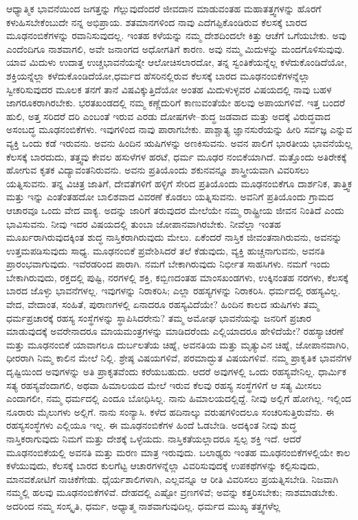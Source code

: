 \vskip   4pt

ಆಧ್ಯಾತ್ಮಿಕ ಭಾವನೆಯಿಂದ ಜಗತ್ತನ್ನು ಗೆಲ್ಲುವುದೆಂದರೆ ಜೀವದಾನ ಮಾಡುವಂತಹ ಮಹಾತತ್ತ್ವಗಳನ್ನು ಹೊರಗೆ ಕಳುಹಿಸಬೇಕೆಂಬುದೇ ನನ್ನ ಅಭಿಪ್ರಾಯ. ಶತಮಾನಗಳಿಂದ ನಾವು ಎದೆಗಪ್ಪಿಕೊಂಡಿರುವ ಕೆಲಸಕ್ಕೆ ಬಾರದ ಮೂಢನಂಬಿಕೆಗಳನ್ನು ರವಾನಿಸುವುದಲ್ಲ. ಇಂತಹ ಕಳೆಯನ್ನು ನಮ್ಮ ದೇಶದಿಂದಲೇ ಕಿತ್ತು ಆಚೆಗೆ ಒಗೆಯಬೇಕು. ಅವು ಎಂದೆಂದಿಗೂ ನಾಶವಾಗಲಿ, ಅವೇ ಜನಾಂಗದ ಅಧೋಗತಿಗೆ ಕಾರಣ. ಅವು ನಮ್ಮ ಮಿದುಳನ್ನು ಮಂದ\break ಗೊಳಿಸುವುವು. ಯಾವ ಮಿದುಳು ಉದಾತ್ತ ಉಚ್ಚಭಾವನೆಯನ್ನೇ ಆಲೋಚಿಸಲಾರದೋ, ತನ್ನ ಸ್ವಂತಿಕೆಯನ್ನೆಲ್ಲ ಕಳೆದುಕೊಂಡಿದೆಯೋ, ಶಕ್ತಿಯನ್ನೆಲ್ಲಾ ಕಳೆದುಕೊಂಡಿದೆಯೋ,\break ಧರ್ಮದ ಹೆಸರಿನಲ್ಲಿರುವ ಕೆಲಸಕ್ಕೆ ಬಾರದ ಮೂಢನಂಬಿಕೆಗಳನ್ನೆಲ್ಲಾ ಸ್ವೀಕರಿಸುವುದರ ಮೂಲಕ ತನಗೆ ತಾನೆ ವಿಷವಿಕ್ಕುತ್ತಿದೆಯೋ ಅಂತಹ ಮಿದುಳುಳ್ಳವರ ವಿಷಯದಲ್ಲಿ ನಾವು ಬಹಳ ಜಾಗರೂಕರಾಗಿರಬೇಕು. ಭರತಖಂಡದಲ್ಲಿ ನಮ್ಮ ಕಣ್ಣೆದುರಿಗೆ ಕಾಣುವಂತೆಯೇ ಹಲವು ಅಪಾಯಗಳಿವೆ. ಇತ್ತ ಬಂದರೆ ಹುಲಿ, ಅತ್ತ ಸರಿದರೆ ದರಿ ಎಂಬಂತೆ ಇರುವ ಎರಡು ದೋಷಗಳೇ–ಶುದ್ಧ ಜಡವಾದ ಮತ್ತು ಅದಕ್ಕೆ ವಿರುದ್ಧವಾದ ಅಸಂಬದ್ಧ ಮೂಢನಂಬಿಕೆಗಳು. ಇವುಗಳಿಂದ ನಾವು ಪಾರಾಗಬೇಕು. ಪಾಶ್ಚಾತ್ಯ ಜ್ಞಾನಸುರೆಯನ್ನು ಹೀರಿ ಸರ್ವಜ್ಞ ಎನ್ನುವ ವ್ಯಕ್ತಿ ಒಂದು ಕಡೆ ಇರುವನು. ಅವನು ಹಿಂದಿನ ಋಷಿಗಳನ್ನು ಅಣಕಿಸುವನು. ಅವನ ಪಾಲಿಗೆ ಭಾರತೀಯ ಭಾವನೆಯೆಲ್ಲ ಕೆಲಸಕ್ಕೆ ಬಾರದುದು, ತತ್ತ್ವವು ಕೇವಲ ಹಸುಳೆಗಳ ಹರಟೆ, ಧರ್ಮ ಮೂಢರ ನಂಬಿಕೆಯಾಗಿದೆ. ಮತ್ತೊಂದು ಅತಿರೇಕಕ್ಕೆ ಹೋಗುವ ಕೃತಕ ವಿದ್ಯಾವಂತನಿರುವನು. ಅವನು ಪ್ರತಿಯೊಂದು ಶಕುನವನ್ನೂ ಶಾಸ್ತ್ರೀಯವಾಗಿ ವಿವರಿಸಲು ಯತ್ನಿಸುವನು. ತನ್ನ ವಿಚಿತ್ರ ಜಾತಿಗೆ, ದೇವತೆಗಳಿಗೆ ಹಳ್ಳಿಗೆ ಸೇರಿದ ಪ್ರತಿಯೊಂದು ಮೂಢನಂಬಿಕೆಗೂ ದಾರ್ಶನಿಕ, ತಾತ್ತ್ವಿಕ ಮತ್ತು ಇನ್ನು ಎಂತೆಂತಹದೋ ಬಾಲಿಶವಾದ ವಿವರಣೆ ಕೊಡಲು ಯತ್ನಿಸುವನು. ಅವನಿಗೆ ಪ್ರತಿಯೊಂದು ಗ್ರಾಮದ ಆಚಾರವೂ ಒಂದು ವೇದ ವಾಕ್ಯ. ಅದನ್ನು ಜಾರಿಗೆ ತರುವುದರ ಮೇಲೆಯೇ ನಮ್ಮ ರಾಷ್ಟ್ರೀಯ ಜೀವನ ನಿಂತಿದೆ ಎಂದು ಭಾವಿಸುವನು. ನೀವು ಇದರ ವಿಷಯದಲ್ಲಿ ತುಂಬಾ ಜೋಪಾನವಾಗಿರಬೇಕು. ನೀವೆಲ್ಲಾ ಇಂತಹ ಮೂರ್ಖರಾಗಿರುವುದಕ್ಕಿಂತ ಶುದ್ಧ ನಾಸ್ತಿಕರಾಗಿರುವುದು ಮೇಲು. ಏಕೆಂದರೆ ನಾಸ್ತಿಕ ಜೀವಂತನಾಗಿರುವನು, ಅವನನ್ನು ಉತ್ತಮಪಡಿಸುವುದು ಸಾಧ್ಯ. ಮೂಢನಂಬಿಕೆ ಪ್ರವೇಶಿಸಿದರೆ ತಲೆ ಕೆಡುವುದು, ವ್ಯಕ್ತಿ ಹುಚ್ಚನಾಗುವನು, ಅವನತಿ ಪ್ರಾರಂಭವಾಗುವುದು. ಇವೆರಡರಿಂದ ಪಾರಾಗಿ. ನಮಗೆ ಬೇಕಾಗಿರುವುದು ನಿರ್ಭೀತ ಸಾಹಸಿಗಳು. ನಮಗೆ ಇಂದು ಬೇಕಾಗಿರುವುದು, ರಕ್ತದಲ್ಲಿ ಪುಷ್ಟಿ, ನರಗಳಲ್ಲಿ ಶಕ್ತಿ, ಕಬ್ಬಿಣದಂತಹ ಮಾಂಸಖಂಡಗಳು, ಉಕ್ಕಿನಂತಹ ನರಗಳು, ಕೆಲಸಕ್ಕೆ ಬಾರದ ಜೊಳ್ಳು ಭಾವನೆಗಳಲ್ಲ. ಇವುಗಳನ್ನು ನಿರಾಕರಿಸಿ; ಎಲ್ಲಾ ರಹಸ್ಯಗಳನ್ನು ನಿರಾಕರಿಸಿ. ಧರ್ಮದಲ್ಲಿ ರಹಸ್ಯವಿಲ್ಲ. ವೇದ, ವೇದಾಂತ, ಸಂಹಿತೆ, ಪುರಾಣಗಳಲ್ಲಿ ಏನಾದರೂ ರಹಸ್ಯವಿದೆಯೇ? ಹಿಂದಿನ ಕಾಲದ ಋಷಿಗಳು ತಮ್ಮ ಧರ್ಮಪ್ರಚಾರಕ್ಕೆ ರಹಸ್ಯ ಸಂಸ್ಥೆಗಳನ್ನು ಸ್ಥಾಪಿಸಿದರೇನು? ತಮ್ಮ ಅಮೋಘ ಭಾವನೆಯನ್ನು ಜನರಿಗೆ ಪ್ರಚಾರ ಮಾಡುವುದಕ್ಕೆ ಅವರೇನಾದರೂ ಮಾಯಮಂತ್ರಗಳನ್ನು ಮಾಡಿದರೆಂದು ಎಲ್ಲಿಯಾದರೂ ಹೇಳಿದೆಯೇ? ರಹಸ್ಯಾಚರಣೆ ಮತ್ತು ಮೂಢನಂಬಿಕೆ ಯಾವಾಗಲೂ ದುರ್ಬಲತೆಯ ಚಿಹ್ನೆ, ಅವನತಿಯ ಮತ್ತು ಮೃತ್ಯುವಿನ ಚಿಹ್ನೆ, ಜೋಪಾನವಾಗಿರಿ, ಧೀರರಾಗಿ ನಿಮ್ಮ ಕಾಲಿನ ಮೇಲೆ ನಿಲ್ಲಿ. ಶ್ರೇಷ್ಠ ವಿಷಯಗಳಿವೆ, ಪರಮಾದ್ಭುತ ವಿಷಯಗಳಿವೆ. ನಮ್ಮ ಪ್ರಾಕೃತಿಕ ಭಾವನೆಗಳ ದೃಷ್ಟಿಯಿಂದ ಅವುಗಳನ್ನು ಅತಿ ಪ್ರಾಕೃತವೆಂದು ಕರೆಯಬಹುದು. ಆದರೆ ಅವುಗಳಲ್ಲಿ ಒಂದು ರಹಸ್ಯವೇನಿಲ್ಲ. ಧಾರ್ಮಿಕ ಸತ್ಯ ರಹಸ್ಯವೆಂದಾಗಲಿ, ಅಥವಾ ಹಿಮಾಲಯದ ಮೇಲೆ ಇರುವ ಕೆಲವು ರಹಸ್ಯ ಸಂಸ್ಥೆಗಳಿಗೆ ಆ ಸತ್ಯ ಮೀಸಲು ಎಂದಾಗಲೀ, ನಮ್ಮ ಧರ್ಮದಲ್ಲಿ ಎಂದೂ ಬೋಧಿಸಿಲ್ಲ. ನಾನು ಹಿಮಾಲಯದಲ್ಲಿದ್ದೆ. ನೀವು ಅಲ್ಲಿಗೆ ಹೋಗಿಲ್ಲ. ಇಲ್ಲಿಂದ ನೂರಾರು ಮೈಲುಗಳು ಅಲ್ಲಿಗೆ. ನಾನು ಸಂನ್ಯಾಸಿ. ಕಳೆದ ಹದಿನಾಲ್ಕು ವರುಷಗಳಿಂದಲೂ ಸಂಚರಿಸುತ್ತಿರುವೆನು. ಈ ರಹಸ್ಯಸಂಸ್ಥೆಗಳು ಎಲ್ಲಿಯೂ ಇಲ್ಲ. ಈ ಮೂಢನಂಬಿಕೆಗಳ ಹಿಂದೆ ಓಡಬೇಡಿ. ಅದಕ್ಕಿಂತ ನೀವು ಶುದ್ಧ ನಾಸ್ತಿಕರಾಗುವುದು ನಿಮಗೆ ಮತ್ತು ದೇಶಕ್ಕೆ ಒಳ್ಳೆಯದು. ನಾಸ್ತಿಕತೆಯಲ್ಲಾದರೂ ಸ್ವಲ್ಪ ಶಕ್ತಿ ಇದೆ. ಆದರೆ ಮೂಢನಂಬಿಕೆಯಲ್ಲಿ ಅವನತಿ ಮತ್ತು ಮರಣ ಮಾತ್ರ ಇರುವುದು. ಬಲಾಢ್ಯರು ಇಂತಹ ಮೂಢನಂಬಿಕೆಗಳಲ್ಲಿಯೇ ಕಾಲ ಕಳೆಯುವುದು, ಕೆಲಸಕ್ಕೆ ಬಾರದ ಕುಲಗೆಟ್ಟ ಆಚಾರಗಳನ್ನೆಲ್ಲಾ ವಿವರಿಸುವುದಕ್ಕೆ ಉಪಕಥೆಗಳನ್ನು ಕಲ್ಪಿಸುವುದು, ಮಾನವಕೋಟಿಗೆ ನಾಚಿಕೆಗೇಡು. ಧೈರ್ಯಶಾಲಿಗಳಾಗಿ, ಎಲ್ಲವನ್ನೂ ಆ ರೀತಿ ವಿವರಿಸಲು ಪ್ರಯತ್ನಿಸಬೇಡಿ. ನಿಜವಾಗಿ ನಮ್ಮಲ್ಲಿ ಹಲವು ಮೂಢನಂಬಿಕೆಗಳಿವೆ. ದೇಹದಲ್ಲಿ ಎಷ್ಟೋ ವ್ರಣಗಳಿವೆ; ಅವನ್ನು ಕತ್ತರಿಸಬೇಕು; ನಾಶಮಾಡಬೇಕು. ಅದರಿಂದ ನಮ್ಮ ಸಂಸ್ಕೃತಿ, ಧರ್ಮ, ಅಧ್ಯಾತ್ಮ ನಾಶವಾಗುವುದಿಲ್ಲ. ಧರ್ಮದ ಮುಖ್ಯ ತತ್ತ್ವಗಳೆಲ್ಲ 